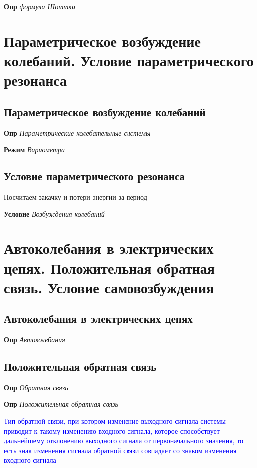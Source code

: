 \documentclass[a4paper, 14pt]{article}
\begin{document}
    \textbf{Опр} \textit{формула Шоттки}
    
    \section{Параметрическое возбуждение колебаний.
    Условие параметрического резонанса}
    
    \subsection{Параметрическое возбуждение колебаний}
    
    \textbf{Опр} \textit{Параметрические колебательные системы}
    
    \textbf{Режим} \textit{Вариометра}
    
    \subsection{Условие параметрического резонанса}
    
    Посчитаем закачку и потери энергии за период
    
    \textbf{Условие} \textit{Возбуждения колебаний}
    
    \section{Автоколебания в электрических цепях.
    Положительная обратная связь.
    Условие самовозбуждения}
    
    \subsection{Автоколебания в электрических цепях}
    
    \textbf{Опр} \textit{Автоколебания}
    
    \subsection{Положительная обратная связь}
    
    \textbf{Опр} \textit{Обратная связь}
    
    \textbf{Опр} \textit{Положительная обратная связь}
    
    \textcolor{blue}{Тип обратной связи, при котором изменение выходного сигнала системы приводит к такому изменению
    входного сигнала, которое способствует дальнейшему отклонению выходного сигнала от первоначального значения, то
    есть знак изменения сигнала обратной связи совпадает со знаком изменения входного сигнала}
    
\end{document}

